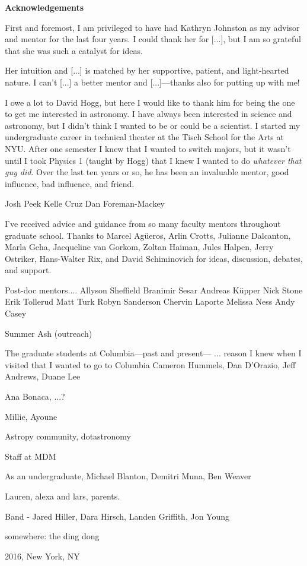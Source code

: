 \newpage

\begin{center}
    {\large \bf Acknowledgements }
\end{center}

\vspace{0.8cm}

First and foremost, I am privileged to have had Kathryn Johnston as my advisor and mentor for the last four years. I could thank her for [...], but I am so grateful that she was such a catalyst for ideas.

Her intuition and [...] is matched by her supportive, patient, and light-hearted nature. I can't [...] a better mentor and [...]---thanks also for putting up with me!

I owe a lot to David Hogg, but here I would like to thank him for being the one to get me interested in astronomy. I have always been interested in science and astronomy, but I didn't think I wanted to be or could be a scientist. I started my undergraduate career in technical theater at the Tisch School for the Arts at NYU. After one semester I knew that I wanted to switch majors, but it wasn't until I took Physics 1 (taught by Hogg) that I knew I wanted to do \emph{whatever that guy did}. Over the last ten years or so, he has been an invaluable mentor, good influence, bad influence, and friend.

Josh Peek
Kelle Cruz
Dan Foreman-Mackey

I've received advice and guidance from so many faculty mentors throughout graduate school. Thanks to Marcel Ag\"ueros, Arlin Crotts, Julianne Dalcanton, Marla Geha, Jacqueline van Gorkom, Zoltan Haiman, Jules Halpen, Jerry Ostriker, Hans-Walter Rix, and David Schiminovich for ideas, discussion, debates, and support.

Post-doc mentors....
Allyson Sheffield
Branimir Sesar
Andreas K\"upper
Nick Stone
Erik Tollerud
Matt Turk
Robyn Sanderson
Chervin Laporte
Melissa Ness
Andy Casey

Summer Ash (outreach)

The graduate students at Columbia---past and present--- ... reason I knew when I visited that I wanted to go to Columbia
Cameron Hummels, Dan D'Orazio, Jeff Andrews, Duane Lee

Ana Bonaca, ...?

Millie, Ayoune

Astropy community, dotastronomy

Staff at MDM

As an undergraduate, Michael Blanton, Demitri Muna, Ben Weaver

Lauren, alexa and lars, parents.

Band - Jared Hiller, Dara Hirsch, Landen Griffith, Jon Young

somewhere: the ding dong

\vspace{1.8cm}
2016, New York, NY

